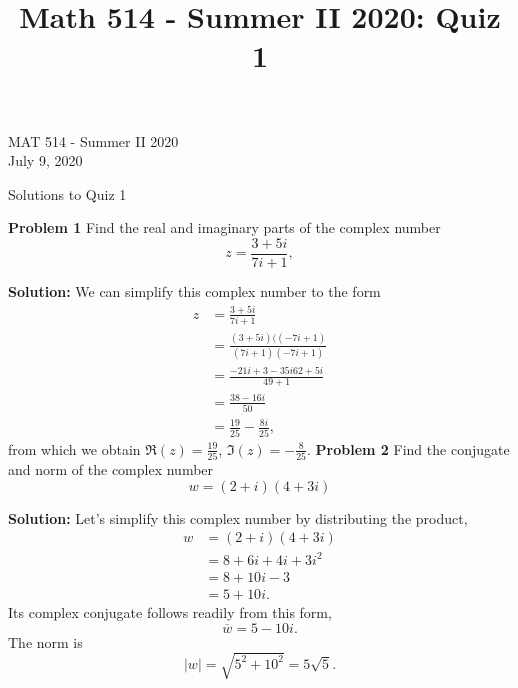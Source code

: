 \documentclass[12pt,oneside]{exam}
\title{Math 514 - Summer II 2020: Quiz 1}
\newenvironment{exercise}[1]{\vspace{.1in}\noindent\textbf{Problem #1 \hspace{.05em}}}{}
\begin{document}
\begin{flushright}
\sc MAT 514 - Summer II 2020\\
July 9, 2020
\end{flushright}
\bigskip
 
\begin{center}
\textsf{Solutions to Quiz 1} 
\end{center}


\begin{exercise}{1}
Find the real and imaginary parts of the complex number
\begin{equation*}
z=\frac{3+5i}{7i+1},
\end{equation*}
\end{exercise}

\textbf{Solution:} We can simplify this complex number to the form 
\begin{align*}
z & = \frac{3+5i}{7i+1} \\
& = \frac{(3+5i)((-7i+1)}{(7i+1)(-7i+1)} \\
& = \frac{-21i+3-35i62+5i}{49+1}\\
& = \frac{38 -16i}{50} \\
& = \frac{19}{25} -\frac{8i}{25},
\end{align*}
from which we obtain $\Re(z) = \frac{19}{25}$, $\Im(z) = -\frac{8}{25}$. 
\vfill
\begin{exercise}{2}
Find the conjugate and norm of the complex number
\begin{equation*}
w=(2+i)(4+3i)
\end{equation*}
\end{exercise}

\textbf{Solution:} Let's simplify this complex number by distributing the product, 
\begin{align*}
w & = (2+i)(4+3i) \\
& = 8+6i+4i+3i^2 \\
& = 8+10i-3 \\
& = 5+10i.
\end{align*}
Its complex conjugate follows readily from this form, 
\begin{equation*}
\overline{w}= 5-10i.
\end{equation*}
The norm is 
\begin{equation*}
|w| = \sqrt{5^2+10^2} = 5\sqrt{5}.
\end{equation*}
\vfill
\end{document}
